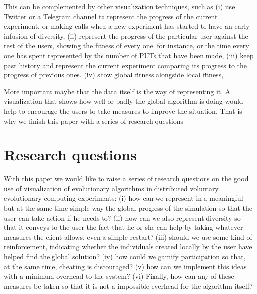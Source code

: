 \documentclass{sig-alternate}
\begin{document}
This can be complemented by other visualization techniques, such as 
(i) use Twitter or a Telegram channel to represent the progress of
  the current experiment, or making calls when a new experiment has
  started to have an early infusion of diversity, 
(ii) represent the progress of the particular user against the rest
  of the users, showing the fitness of every one, for instance, or the
  time every one has spent represented by the number of PUTs that have
  been made,
(iii) keep past history and represent the current experiment comparing its
  progress to the progress of previous ones.
(iv) show global fitness alongside local fitness, 

More important maybe that the data itself is the way of representing
it. A visualization that shows how well or badly the global algorithm
is doing would help to encourage the users to take measures to improve
the situation. That is why we finish this paper with a series of
research questions

\section{Research questions}

With this paper we would like to raise a series of research questions
on the good use of visualization of evolutionary algorithms in
distributed voluntary evolutionary computing experiments:
(i) how can we represent in a meaningful but at the same time simple
  way the global progress of the simulation so that the user can take
  action if he needs to?
(ii) how can we also represent diversity so that it conveys to the
  user the fact that he or she can help by taking whatever measures
  the client allows, even a simple restart?
(iii) should we use some kind of reinforcement, indicating whether the
  individuals created locally by the user have helped find the global solution?
(iv) how could we gamify participation so that, at the same time,
  cheating is discouraged?
(v) how can we implement this ideas with a minimum overhead to the system?  
(vi) Finally, how can any of these measures be taken so that it is
  not a impossible overhead for the algorithm itself?
\end{document}
